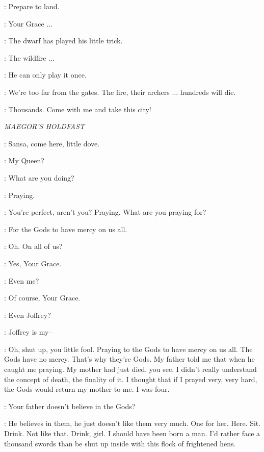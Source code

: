 \STANNIS: Prepare to land. 

\CAPTAIN: Your Grace $\ldots$ 

\STANNIS: The dwarf has played his little trick. 

\CAPTAIN: The wildfire $\ldots$  

\STANNIS: He can only play it once. 

\CAPTAIN: We're too far from the gates. The fire, their archers $\ldots$ hundreds will die. 

\STANNIS: Thousands.  Come with me and take this city! 



\scene

\textit{MAEGOR'S HOLDFAST}


\CERSEI: Sansa, come here, little dove. 

\SANSA:  My Queen?

\CERSEI: What are you doing? 

\SANSA: Praying. 

\CERSEI: You're perfect, aren't you? Praying. What are you praying for? 

\SANSA: For the Gods to have mercy on us all. 

\CERSEI: Oh. On all of us? 

\SANSA: Yes, Your Grace. 

\CERSEI: Even me? 

\SANSA: Of course, Your Grace. 

\CERSEI: Even Joffrey? 

\SANSA: Joffrey is my-- 

\CERSEI: Oh, shut up, you little fool. Praying to the Gods to have mercy on us all. The Gods have no mercy. That's why they're Gods. My father told me that when he caught me praying. My mother had just died, you see. I didn't really understand the concept of death, the finality of it. I thought that if I prayed very, very hard, the Gods would return my mother to me. I was four. 

\SANSA: Your father doesn't believe in the Gods? 

\CERSEI: He believes in them, he just doesn't like them very much.  One for her.  Here.  Sit. Drink.  Not like that. Drink, girl.  I should have been born a man. I'd rather face a thousand swords than be shut up inside with this flock of frightened hens. 

